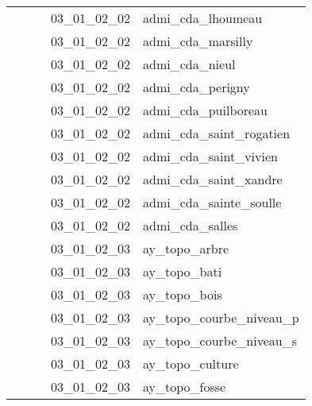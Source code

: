 \documentclass[12pt,titlepage]{book}
\begin{document}
\begin{supertabular}{|p{7.5cm}|p{7.5cm}|p{7.5cm}|c|p{10cm}|}
                   &                    &                    & 03\_01\_02\_02 & admi\_cda\_lhoumeau\\
                   &                    &                    & 03\_01\_02\_02 & admi\_cda\_marsilly\\
                   &                    &                    & 03\_01\_02\_02 & admi\_cda\_nieul\\
                   &                    &                    & 03\_01\_02\_02 & admi\_cda\_perigny\\
                   &                    &                    & 03\_01\_02\_02 & admi\_cda\_puilboreau\\
                   &                    &                    & 03\_01\_02\_02 & admi\_cda\_saint\_rogatien\\
                   &                    &                    & 03\_01\_02\_02 & admi\_cda\_saint\_vivien\\
                   &                    &                    & 03\_01\_02\_02 & admi\_cda\_saint\_xandre\\
                   &                    &                    & 03\_01\_02\_02 & admi\_cda\_sainte\_soulle\\
                   &                    &                    & 03\_01\_02\_02 & admi\_cda\_salles\\
                   &                    &                    & 03\_01\_02\_03 & ay\_topo\_arbre\\
                   &                    &                    & 03\_01\_02\_03 & ay\_topo\_bati\\
                   &                    &                    & 03\_01\_02\_03 & ay\_topo\_bois\\
                   &                    &                    & 03\_01\_02\_03 & ay\_topo\_courbe\_niveau\_p\\
                   &                    &                    & 03\_01\_02\_03 & ay\_topo\_courbe\_niveau\_s\\
                   &                    &                    & 03\_01\_02\_03 & ay\_topo\_culture\\
                   &                    &                    & 03\_01\_02\_03 & ay\_topo\_fosse\\

\end{supertabular}
\end{document}
